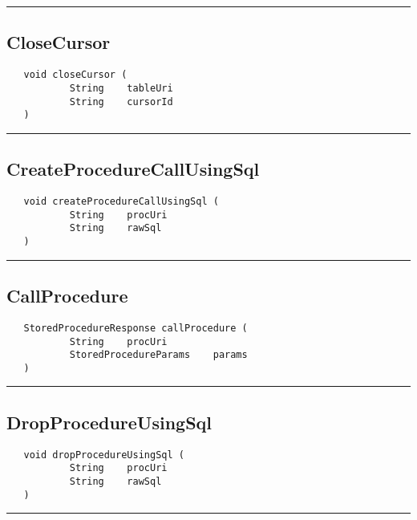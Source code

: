\rule{15cm}{2pt}
\subsection{CloseCursor}
\label{Api:CloseCursor}
\begin{verbatim}
   void closeCursor (
           String    tableUri
           String    cursorId
   )
\end{verbatim}



\rule{15cm}{2pt}
\subsection{CreateProcedureCallUsingSql}
\label{Api:CreateProcedureCallUsingSql}
\begin{verbatim}
   void createProcedureCallUsingSql (
           String    procUri
           String    rawSql
   )
\end{verbatim}



\rule{15cm}{2pt}
\subsection{CallProcedure}
\label{Api:CallProcedure}
\begin{verbatim}
   StoredProcedureResponse callProcedure (
           String    procUri
           StoredProcedureParams    params
   )
\end{verbatim}



\rule{15cm}{2pt}
\subsection{DropProcedureUsingSql}
\label{Api:DropProcedureUsingSql}
\begin{verbatim}
   void dropProcedureUsingSql (
           String    procUri
           String    rawSql
   )
\end{verbatim}



\rule{15cm}{2pt}
